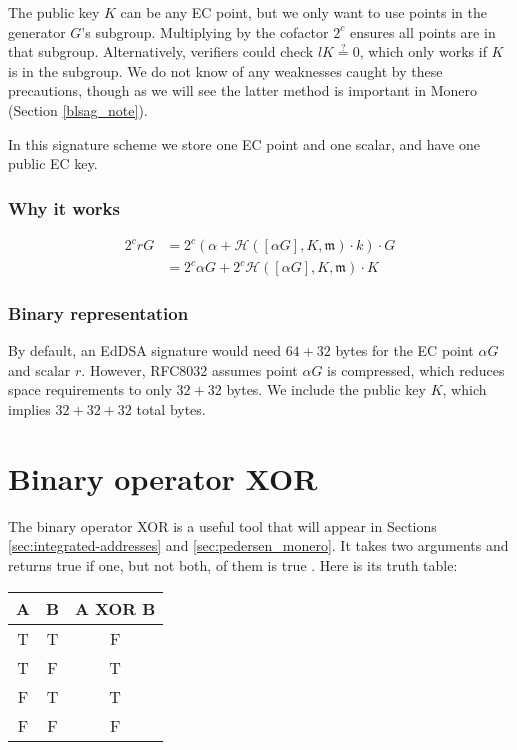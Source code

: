 The public key $K$ can be any EC point, but we only want to use points in the generator $G$'s subgroup. Multiplying by the cofactor $2^c$ ensures all points are in that subgroup. Alternatively, verifiers could check $l K \stackrel{?}{=} 0$, which only works if $K$ is in the subgroup. We do not know of any weaknesses caught by these precautions, though as we will see the latter method is important in Monero (Section \ref{blsag_note}).

In this signature scheme we store one EC point and one scalar, and have one public EC key.

\subsubsection*{Why it works}
\begin{align*}
2^c r G &= 2^c (\alpha + \mathcal{H}([\alpha G], K,  \mathfrak{m}) \cdot k) \cdot G \\
		&= 2^c \alpha G + 2^c \mathcal{H}([\alpha G], K,  \mathfrak{m}) \cdot K 
\end{align*}

\subsubsection*{Binary representation}

By default, an EdDSA signature would need \(64 + 32\) bytes for the EC point $\alpha G$ and scalar $r$. However, RFC8032 assumes point \(\alpha G\) is compressed, which reduces space requirements to only \(32 + 32\) bytes. We include the public key $K$, which implies \(32 + 32 + 32\) total bytes.



\section{Binary operator XOR}
\label{sec:XOR_section}

The binary operator XOR is a useful tool that will appear in Sections \ref{sec:integrated-addresses} and \ref{sec:pedersen_monero}. It takes two arguments and returns true if one, but not both, of them is true \cite{wolfram-xor}. Here is its truth table:

\begin{center}
    \begin{tabular}{|c|c|c|}
    \hline
        A & B & A XOR B \\
    \hline\hline
        T & T & F \\
    \hline
        T & F & T \\
    \hline
        F & T & T \\
    \hline
        F & F & F \\
    \hline
    \end{tabular}
\end{center}

